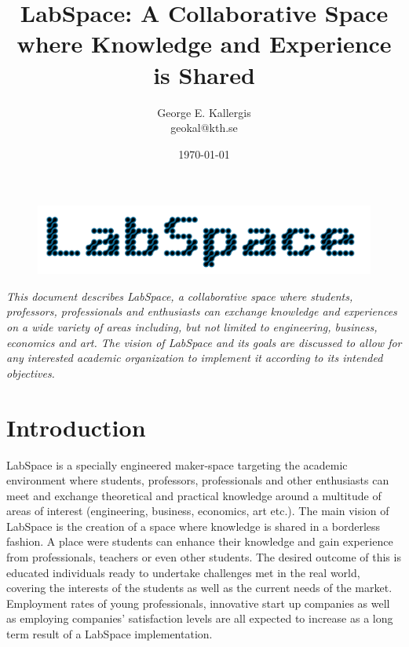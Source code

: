 \documentclass[a4paper, 11pt]{article}
\title{LabSpace: A Collaborative Space where Knowledge and Experience is Shared}
\author{George E. Kallergis\\geokal@kth.se}
\date{\today{}}
\begin{document}
\maketitle

\begin{figure}[h!]
  \begin{center}
    \includegraphics[width=\textwidth,height=\textheight,keepaspectratio]{imagery/logo.png}
    \label{fig:dneaf}
  \end{center}
\end{figure}

\textit{This document describes LabSpace, a collaborative space where students, professors, professionals and enthusiasts can exchange knowledge and experiences on a wide variety of areas including, but not limited to engineering, business, economics and art. The vision of LabSpace and its goals are discussed to allow for any interested academic organization to implement it according to its intended objectives.}

\newpage

\section*{Introduction}
LabSpace is a specially engineered maker-space \cite{whatsamakerspace} targeting the academic environment where students, professors, professionals and other enthusiasts can meet and exchange theoretical and practical knowledge around a multitude of areas of interest (engineering, business, economics, art etc.). The main vision of LabSpace is the creation of a space where knowledge is shared in a borderless fashion. A place were students can enhance their knowledge and gain experience from  professionals, teachers or even other students. The desired outcome of this is educated individuals ready to undertake challenges met in the real world, covering  the interests of the students as well as the current needs of the market. Employment rates of young professionals, innovative start up companies as well as employing companies' satisfaction levels are all expected to increase as a long term result of a LabSpace implementation.
\end{document}
